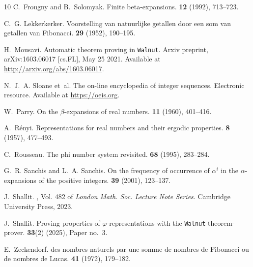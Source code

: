 \documentclass[12pt,reqno]{article}
\begin{document}
\begin{thebibliography}{10}
C.~Frougny and B.~Solomyak.
\newblock Finite beta-expansions.
 {\bf 12} (1992), 713--723.

C.~G. Lekkerkerker.
\newblock Voorstelling van natuurlijke getallen door een som van getallen van
  {Fibonacci}.
 {\bf 29} (1952), 190--195.

H.~Mousavi.
\newblock Automatic theorem proving in {{\tt Walnut}}.
\newblock Arxiv preprint, arXiv:1603.06017 [cs.FL], May 25 2021. Available at
  \url{http://arxiv.org/abs/1603.06017}.

N.~J.~A. Sloane et~al.
\newblock The on-line encyclopedia of integer sequences.
\newblock Electronic resource. Available at \url{https://oeis.org}.

W.~Parry.
\newblock On the $\beta$-expansions of real numbers.
 {\bf 11} (1960), 401--416.

A.~{R\'enyi}.
\newblock Representations for real numbers and their ergodic properties.
 {\bf 8} (1957), 477--493.

C.~Rousseau.
\newblock The phi number system revisited.
 {\bf 68} (1995), 283--284.

G.~R. Sanchis and L.~A. Sanchis.
\newblock On the frequency of occurrence of $\alpha^i$ in the
  $\alpha$-expansions of the positive integers.
 {\bf 39} (2001), 123--137.

J.~Shallit.
, Vol. 482 of {\em London Math. Soc.
  Lecture Note Series}.
\newblock Cambridge University Press, 2023.

J.~Shallit.
\newblock Proving properties of $\varphi$-representations with the
  {{\texttt{Walnut}}} theorem-prover.
 {\bf 33}(2) (2025), Paper no.~3.

E.~Zeckendorf.
 des nombres naturels par une somme de nombres de
  {Fibonacci} ou de nombres de {Lucas}.
 {\bf 41} (1972), 179--182.

\end{thebibliography}
\end{document}
